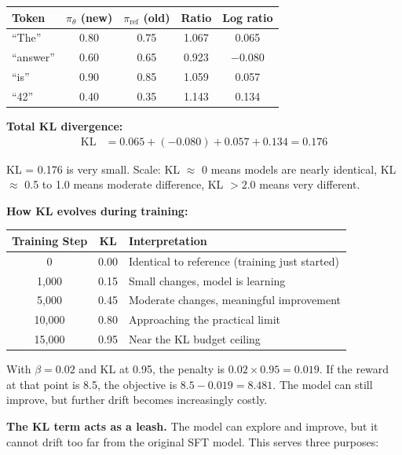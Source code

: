 \begin{chapterenv}
\begin{center}
\begin{tabular}{lcccc}
\toprule
\textbf{Token} & $\pi_\theta$ \textbf{(new)} & $\pi_{\text{ref}}$ \textbf{(old)} & \textbf{Ratio} & \textbf{Log ratio} \\
\midrule
``The'' & 0.80 & 0.75 & 1.067 & 0.065 \\
``answer'' & 0.60 & 0.65 & 0.923 & $-0.080$ \\
``is'' & 0.90 & 0.85 & 1.059 & 0.057 \\
``42'' & 0.40 & 0.35 & 1.143 & 0.134 \\
\bottomrule
\end{tabular}
\end{center}

\textbf{Total KL divergence:}
\begin{align*}
\text{KL} &= 0.065 + (-0.080) + 0.057 + 0.134 = 0.176
\end{align*}

\begin{tipbox}
KL = 0.176 is very small. Scale: KL $\approx$ 0 means models are nearly identical, KL $\approx$ 0.5 to 1.0 means moderate difference, KL $> 2.0$ means very different.
\end{tipbox}

\textbf{How KL evolves during training:}

\begin{center}
\begin{tabular}{ccl}
\toprule
\textbf{Training Step} & \textbf{KL} & \textbf{Interpretation} \\
\midrule
0 & 0.00 & Identical to reference (training just started) \\
1,000 & 0.15 & Small changes, model is learning \\
5,000 & 0.45 & Moderate changes, meaningful improvement \\
10,000 & 0.80 & Approaching the practical limit \\
15,000 & 0.95 & Near the KL budget ceiling \\
\bottomrule
\end{tabular}
\end{center}

With $\beta = 0.02$ and KL at 0.95, the penalty is $0.02 \times 0.95 = 0.019$. If the reward at that point is 8.5, the objective is $8.5 - 0.019 = 8.481$. The model can still improve, but further drift becomes increasingly costly.

\begin{infobox}
\textbf{The KL term acts as a leash.} The model can explore and improve, but it cannot drift too far from the original SFT model. This serves three purposes:


\end{infobox}
\end{chapterenv}

